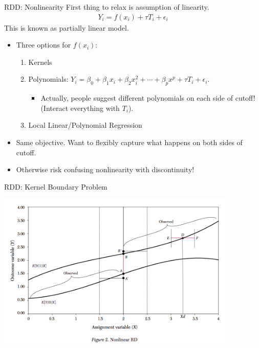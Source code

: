 \documentclass[xcolor=pdftex,dvipsnames,table,mathserif,aspectratio=169]{beamer}
\begin{document}
\begin{frame}{RDD: Nonlinearity}
First thing to relax is assumption of linearity.
\begin{eqnarray*}
Y_i = f(x_i) + \tau T_i  + \epsilon_i
\end{eqnarray*}
This is known as \alert{partially linear model}.
\begin{itemize}
\item Three options for $f(x_i)$:
\begin{enumerate}
\item Kernels
\item Polynomials: $Y_i = \beta_0 + \beta_1 x_i + \beta_2 x_i^2 + \cdots + \beta_p x^p + \tau T_i + \epsilon_i$.
\begin{itemize}
\item Actually, people suggest different polynomials on each side of cutoff! (Interact everything with $T_i$).
\end{itemize}
\item Local Linear/Polynomial Regression
\end{enumerate}
\item Same objective. Want to flexibly capture what happens on both sides of cutoff.
\item Otherwise risk confusing nonlinearity with discontinuity!
\end{itemize}
\end{frame}
	
\begin{frame}{RDD: Kernel Boundary Problem}
\begin{center}
\includegraphics[width=4.5in]{./resources/ll-fig2}
\end{center}
\end{frame}
\end{document}
